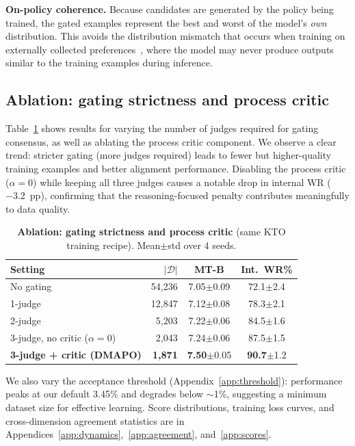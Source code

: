 \documentclass{article}
\newcommand{\res}[2]{#1{\scriptsize$\pm$#2}}
\begin{document}
\textbf{On-policy coherence.} Because candidates are generated by the policy being trained, the gated examples represent the best and worst of the model's \emph{own} distribution. This avoids the distribution mismatch that occurs when training on externally collected preferences~\citep{tunstall2024zephyr}, where the model may never produce outputs similar to the training examples during inference.

\subsection{Ablation: gating strictness and process critic}

Table~\ref{tab:ablation_gating} shows results for varying the number of judges required for gating consensus, as well as ablating the process critic component. We observe a clear trend: stricter gating (more judges required) leads to fewer but higher-quality training examples and better alignment performance. Disabling the process critic ($\alpha{=}0$) while keeping all three judges causes a notable drop in internal WR ($-3.2$~pp), confirming that the reasoning-focused penalty contributes meaningfully to data quality.

\begin{table}[t]
\centering
\caption{\textbf{Ablation: gating strictness and process critic} (same KTO training recipe). Mean$\pm$std over 4 seeds.}
\label{tab:ablation_gating}
\vspace{0.5em}
\begin{tabular}{l r c c}
\toprule
\textbf{Setting} & $|\mathcal{D}|$ & \textbf{MT-B} & \textbf{Int.\ WR\%} \\
\midrule
No gating & 54,236 & \res{7.05}{0.09} & \res{72.1}{2.4} \\
1-judge & 12,847 & \res{7.12}{0.08} & \res{78.3}{2.1} \\
2-judge & 5,203 & \res{7.22}{0.06} & \res{84.5}{1.6} \\
3-judge, no critic ($\alpha{=}0$) & 2,043 & \res{7.24}{0.06} & \res{87.5}{1.5} \\
\textbf{3-judge + critic (DMAPO)} & \textbf{1,871} & \res{\textbf{7.50}}{0.05} & \res{\textbf{90.7}}{1.2} \\
\bottomrule
\end{tabular}
\end{table}

We also vary the acceptance threshold (Appendix~\ref{app:threshold}): performance peaks at our default 3.45\% and degrades below $\sim$1\%, suggesting a minimum dataset size for effective learning. Score distributions, training loss curves, and cross-dimension agreement statistics are in Appendices~\ref{app:dynamics},~\ref{app:agreement}, and~\ref{app:scores}.
\end{document}

